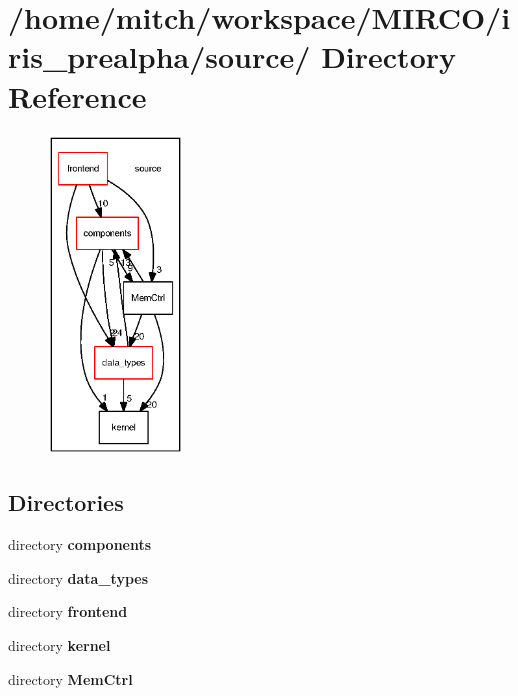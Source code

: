 \section{/home/mitch/workspace/MIRCO/iris\_\-prealpha/source/ Directory Reference}
\label{dir_daaa2c65feb7313880849dfd7dee4210}


\nopagebreak
\begin{figure}[H]
\begin{center}
\leavevmode
\includegraphics[width=101pt]{dir_daaa2c65feb7313880849dfd7dee4210_dep}
\end{center}
\end{figure}
\subsection*{Directories}
\begin{CompactItemize}
\item 
directory {\bf components}
\item 
directory {\bf data\_\-types}
\item 
directory {\bf frontend}
\item 
directory {\bf kernel}
\item 
directory {\bf MemCtrl}
\end{CompactItemize}
